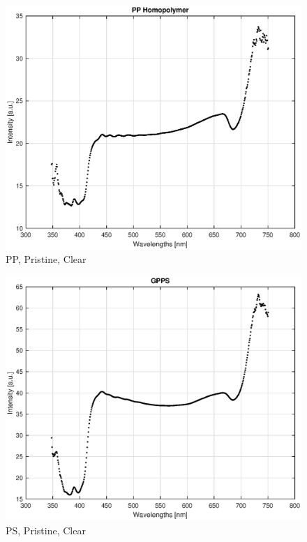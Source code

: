 \begin{appendices}
\begin{figure}
    \centering
    \includegraphics[width = 12cm]{Images/appendix/pp-pristine-clear.eps}
    \caption{PP, Pristine, Clear}
    \label{fig:pp-clear}
\end{figure}

\begin{figure}
    \centering
    \includegraphics[width = 12cm]{Images/appendix/ps-pristine-clear.eps}
    \caption{PS, Pristine, Clear}
    \label{fig:ps-clear}
\end{figure}


\end{appendices}
